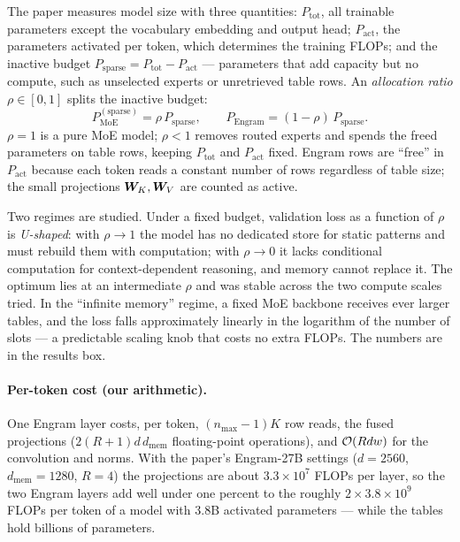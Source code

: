 The paper measures model size with three quantities: $P_{\mathrm{tot}}$, all trainable parameters
except the vocabulary embedding and output head; $P_{\mathrm{act}}$, the parameters activated per
token, which determines the training FLOPs; and the inactive budget
$P_{\mathrm{sparse}} = P_{\mathrm{tot}} - P_{\mathrm{act}}$ --- parameters that add capacity but no
compute, such as unselected experts or unretrieved table rows. An \emph{allocation ratio}
$\rho \in [0,1]$ splits the inactive budget:
\begin{equation}
  P^{(\mathrm{sparse})}_{\mathrm{MoE}} = \rho\, P_{\mathrm{sparse}},\qquad
  P_{\mathrm{Engram}} = (1-\rho)\, P_{\mathrm{sparse}} .
  \label{eq:c10-rho}
\end{equation}
$\rho = 1$ is a pure MoE model; $\rho < 1$ removes routed experts and spends the freed parameters on
table rows, keeping $P_{\mathrm{tot}}$ and $P_{\mathrm{act}}$ fixed. Engram rows are ``free'' in
$P_{\mathrm{act}}$ because each token reads a constant number of rows regardless of table size; the
small projections $\bm{W}_K, \bm{W}_V$ are counted as active.

Two regimes are studied. Under a fixed budget, validation loss as a function of $\rho$ is
\emph{U-shaped}: with $\rho \to 1$ the model has no dedicated store for static patterns and must
rebuild them with computation; with $\rho \to 0$ it lacks conditional computation for
context-dependent reasoning, and memory cannot replace it. The optimum lies at an intermediate
$\rho$ and was stable across the two compute scales tried. In the ``infinite memory'' regime, a
fixed MoE backbone receives ever larger tables, and the loss falls approximately linearly in the
logarithm of the number of slots --- a predictable scaling knob that costs no extra FLOPs. The
numbers are in the results box.

\paragraph{Per-token cost (our arithmetic).} One Engram layer costs, per token, $(n_{\max}-1)K$ row
reads, the fused projections ($2(R+1) d\, d_{\mathrm{mem}}$ floating-point operations), and
$\mathcal{O}(R d w)$ for the convolution and norms. With the paper's Engram-27B settings
($d = 2560$, $d_{\mathrm{mem}} = 1280$, $R = 4$) the projections are about $3.3 \times 10^7$ FLOPs
per layer, so the two Engram layers add well under one percent to the roughly
$2 \times 3.8 \times 10^9$ FLOPs per token of a model with $3.8$B activated parameters --- while the
tables hold billions of parameters.

